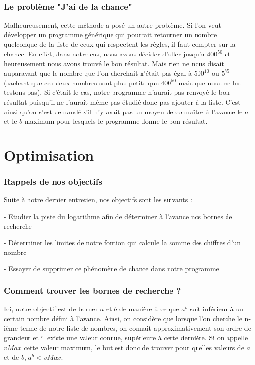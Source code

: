 \documentclass{article}
\begin{document}
\section{Le problème "J'ai de la chance"}
Malheureusement, cette méthode a posé un autre problème. Si l'on veut développer un programme générique qui pourrait retourner un nombre quelconque de la liste de ceux qui respectent les règles, il faut compter sur la chance. En effet, dans notre cas, nous avons décider d'aller jusqu'a $400^{50}$ et heureusement nous avons trouvé le bon résultat. Mais rien ne nous disait auparavant que le nombre que l'on cherchait n'était pas égal à $500^{10}$ ou $5^{75}$ (sachant que ces deux nombres sont plus petits que $400^{50}$ mais que nous ne les testons pas). Si c'était le cas, notre programme n'aurait pas renvoyé le bon résultat puisqu'il ne l'aurait même pas étudié donc pas ajouter à la liste. C'est ainsi qu'on s'est demandé s'il n'y avait pas un moyen de connaître à l'avance le $a$ et le $b$ maximum pour lesquels le programme donne le bon résultat.


\newpage
\part {Optimisation}
\section {Rappels de nos objectifs}
Suite à notre dernier entretien, nos objectifs sont les suivants :

- Etudier la piste du logarithme afin de déterminer à l'avance nos bornes de recherche

- Déterminer les limites de notre fontion qui calcule la somme des chiffres d'un nombre

- Essayer de supprimer ce phénomène de chance dans notre programme

\section{Comment trouver les bornes de recherche ?}

Ici, notre objectif est de borner $a$ et $b$ de manière à ce que $a^{b}$ soit inférieur à un certain nombre défini à l'avance. Ainsi, on considère que lorsque l'on cherche le n-ième terme de notre liste de nombres, on connait approximativement son ordre de grandeur et il existe une valeur connue, supérieure à cette dernière. Si on appelle $vMax$ cette valeur maximum, le but est donc de trouver pour quelles valeurs de $a$ et de $b$, $a^{b}  < vMax$.
\end{document}
